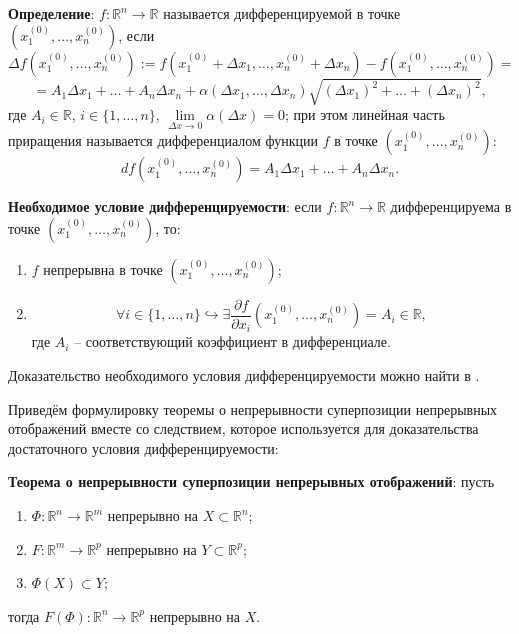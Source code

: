 \documentclass[12pt, a4paper, reqno]{article}
\begin{document}
    \textbf{Определение}: $f: \mathbb{R}^n \to \mathbb{R}$ называется дифференцируемой в точке
    $(x_1^{(0)}, \ldots, x_n^{(0)})$, если
    \begin{equation*}
        \Delta f(x_1^{(0)}, \ldots, x_n^{(0)}) :=
        f(x_1^{(0)} + \Delta x_1, \ldots, x_n^{(0)} + \Delta x_n) - f(x_1^{(0)}, \ldots, x_n^{(0)}) =
    \end{equation*}
    \begin{equation*}
        = A_1 \Delta x_1 + \ldots + A_n \Delta x_n + \alpha(\Delta x_1, \ldots, \Delta x_n)
        \sqrt{(\Delta x_1)^2 + \ldots + (\Delta x_n)^2},
    \end{equation*}
    где $A_i \in \mathbb{R}$, $i \in \{1, \ldots, n\}$, $\lim\limits_{\Delta x \to 0} \alpha(\Delta x) = 0$;
    при этом линейная часть приращения называется дифференциалом функции $f$ в точке
    $(x_1^{(0)}, \ldots, x_n^{(0)})$:
    \begin{equation*}
        df(x_1^{(0)}, \ldots, x_n^{(0)}) = A_1 \Delta x_1 + \ldots + A_n \Delta x_n.
    \end{equation*}

    \textbf{Необходимое условие дифференцируемости}: если $f: \mathbb{R}^n \to \mathbb{R}$ дифференцируема
    в точке $(x_1^{(0)}, \ldots, x_n^{(0)})$, то:
    \begin{enumerate}
        \item $f$ непрерывна в точке $(x_1^{(0)}, \ldots, x_n^{(0)})$;
        \item
            \begin{equation*}
                \forall i \in \{1, \ldots, n\} \hookrightarrow \exists
                \frac{\partial f}{\partial x_i}(x_1^{(0)}, \ldots, x_n^{(0)}) = A_i \in \mathbb{R},
            \end{equation*}
            где $A_i$ -- соответствующий коэффициент в дифференциале.
    \end{enumerate}

    Доказательство необходимого условия дифференцируемости можно найти в \cite{petrovich-2}.

    Приведём формулировку теоремы о непрерывности суперпозиции непрерывных отображений вместе со
    следствием, которое используется для доказательства достаточного условия дифференцируемости:

    \textbf{Теорема о непрерывности суперпозиции непрерывных отображений}: пусть
    \begin{enumerate}
        \item $\Phi: \mathbb{R}^n \to \mathbb{R}^m$ непрерывно на $X \subset \mathbb{R}^n$;
        \item $F: \mathbb{R}^m \to \mathbb{R}^p$ непрерывно на $Y \subset \mathbb{R}^p$;
        \item $\Phi(X) \subset Y$;
    \end{enumerate}
    тогда $F(\Phi): \mathbb{R}^n \to \mathbb{R}^p$ непрерывно на $X$.
\end{document}
